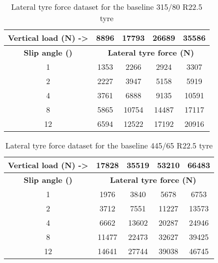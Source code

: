 
\begin{table}[H]
  \centering\footnotesize
  \caption{Lateral tyre force dataset for the baseline 315/80 R22.5 tyre}
    \begin{tabular}{|c|c|c|c|c|}
    \hline
    \textbf{Vertical load (N) ->} & 8896 & 17793 & 26689 & 35586 \bigstrut\\
    \hline
    \textbf{Slip angle (\degree{})} & \multicolumn{4}{c|}{\textbf{Lateral tyre force (N)}} \bigstrut\\
    \hline
    1 & 1353 & 2266 & 2924 & 3307 \bigstrut\\
    \hline
    2 & 2227 & 3947 & 5158 & 5919 \bigstrut\\
    \hline
    4 & 3761 & 6888 & 9135 & 10591 \bigstrut\\
    \hline
    8 & 5865 & 10754 & 14487 & 17117 \bigstrut\\
    \hline
    12 & 6594 & 12522 & 17192 & 20916 \bigstrut\\
    \hline
    \end{tabular}%
  \label{table:baseline-lateral-tyre-force-dataset-315-80-R22.5}
\end{table}%



\begin{table}[H]
	\centering\footnotesize
	\caption{Lateral tyre force dataset for the baseline 445/65 R22.5 tyre}
	\begin{tabular}{|c|c|c|c|c|}
		\hline
		\textbf{Vertical load (N) ->} & 17828 & 35519 & 53210 & 66483 \bigstrut \\
		\hline
		\textbf{Slip angle (\degree{})} & \multicolumn{4}{c|}{\textbf{Lateral tyre force (N)}} \bigstrut\\
		\hline
		1                             & 1976  & 3840  & 5678  & 6753 \bigstrut  \\
		\hline
		2                             & 3712  & 7551  & 11227 & 13573 \bigstrut \\
		\hline
		4                             & 6662  & 13602 & 20287 & 24946 \bigstrut \\
		\hline
		8                             & 11477 & 22473 & 32627 & 39425 \bigstrut \\
		\hline
		12                            & 14641 & 27744 & 39038 & 46745 \bigstrut \\
		\hline
	\end{tabular}%
	\label{table:baseline-lateral-tyre-force-dataset-445-65-R22.5}
\end{table}%

